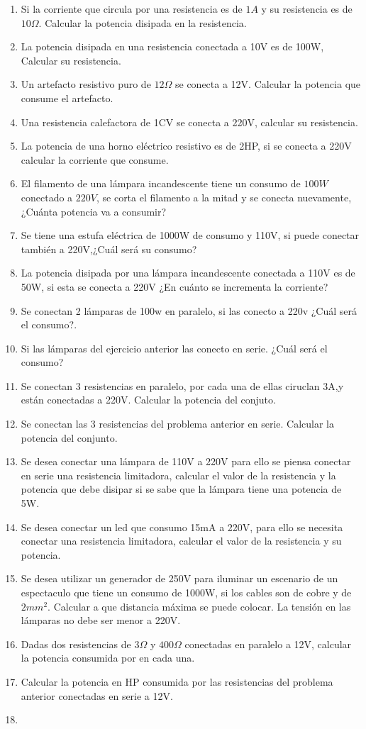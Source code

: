 \documentclass[a4paper]{article}
\begin{document}
\begin{enumerate}
\large    
\item Si la corriente que circula por una resistencia es de  $1A$ y su resistencia es de $10\Omega$. Calcular la potencia disipada en la resistencia.

\item La potencia disipada en una resistencia conectada a 10V es de 100W, Calcular su resistencia.
\item Un artefacto resistivo puro de $12\Omega$ se conecta a 12V. Calcular la potencia que consume el artefacto.
\item Una resistencia calefactora de 1CV se conecta a 220V, calcular su resistencia.
\item La potencia de una horno eléctrico resistivo es de 2HP, si se conecta a 220V calcular la corriente que consume.
\item El filamento de una lámpara incandescente tiene un consumo de $100W$ conectado a $220V$, se corta el filamento a la mitad y se conecta nuevamente,¿Cuánta potencia va a consumir?
\item Se tiene una estufa eléctrica de 1000W de consumo y 110V, si puede conectar también a 220V,¿Cuál será su consumo?
\item La potencia disipada por una lámpara incandescente conectada a 110V es de 50W, si esta se conecta a 220V ¿En cuánto se incrementa la corriente?
\item Se conectan 2 lámparas de 100w en paralelo, si las conecto a 220v ¿Cuál será el consumo?.
\item Si las lámparas del ejercicio anterior las conecto en serie. ¿Cuál será el consumo?
\item Se conectan 3 resistencias en paralelo, por cada una de ellas ciruclan 3A,y están conectadas a 220V. Calcular la potencia del conjuto. 
\item Se conectan las 3 resistencias del problema anterior en serie. Calcular la potencia del conjunto.
\item Se desea conectar una lámpara de 110V a 220V para ello se piensa conectar en serie una resistencia limitadora, calcular el valor de la resistencia y la potencia que debe disipar si se sabe que la lámpara tiene una potencia de 5W.
\item Se desea conectar un led que consumo 15mA a 220V, para ello se necesita conectar una resistencia limitadora, calcular el valor de la resistencia y su potencia.
\item Se desea utilizar un generador de 250V para iluminar un escenario de un espectaculo que tiene un consumo de 1000W, si los cables son de cobre y de $2mm^2$. Calcular a que distancia máxima se puede colocar. La tensión en las lámparas no debe ser menor a 220V.
\item Dadas dos resistencias de $3\Omega$ y $400\Omega$ conectadas en paralelo a 12V, calcular la potencia consumida por en cada una.
\item Calcular la potencia en HP consumida por las resistencias del problema anterior conectadas en serie a 12V.
\item 
\end{enumerate}
\end{document}
